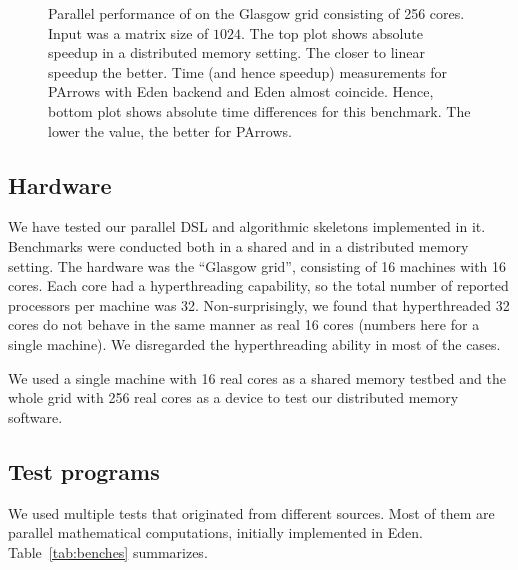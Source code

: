 \begin{figure}
\centering
%
{\label{123123123}}%
{\label{12312312312}}
\caption{Parallel performance of \torustest on the Glasgow grid
  consisting of 256 cores. Input was a matrix size of $1024$. The top plot shows absolute speedup in a distributed memory setting. The
  closer to linear speedup the better. Time
  (and hence speedup) measurements for PArrows with Eden backend and
  Eden almost coincide. Hence, bottom plot shows
absolute time differences for this benchmark. The
lower the value, the better for PArrows.}
\label{123123123122}
\end{figure}




\subsection{Hardware}

We have tested our parallel DSL and algorithmic skeletons implemented
in it. Benchmarks were conducted both in a shared and in a distributed
memory setting. The hardware was the ``Glasgow grid'', consisting of
16 machines with 16 cores. 
Each core had a hyperthreading capability,
so the total number of reported processors per machine was
32. Non-surprisingly, we found that hyperthreaded 32 cores do not
behave in the same manner as real 16 cores (numbers here for a single
machine). We disregarded the hyperthreading ability in most of the
cases.

We used a single machine with 16 real cores as a shared memory testbed
and the whole grid with 256 real cores as a device to test our
distributed memory software.


\subsection{Test programs}

We used multiple tests that originated from different
sources. Most of them are parallel mathematical computations, initially
implemented in Eden. Table~\ref{tab:benches} summarizes.


